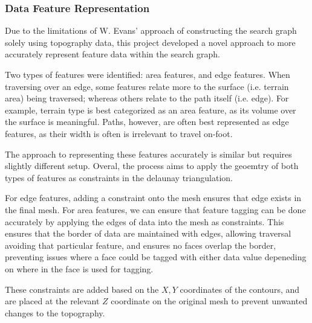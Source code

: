 \documentclass[12pt]{article}
\begin{document}
\subsubsection{Data Feature Representation}


Due to the limitations of W. Evans' approach of constructing the search graph solely using topography data, this project developed a novel approach to more accurately represent feature data within the search graph.

Two types of features were identified: area features, and edge features. When traversing over an edge, some features relate more to the surface (i.e. terrain area) being traversed; whereas others relate to the path itself (i.e. edge). For example, terrain type is best categorized as an area feature, as its volume over the surface is meaningful. Paths, however, are often best represented as edge features, as their width is often is irrelevant to travel on-foot.

The approach to representing these features accurately is similar but requires slightly different setup. Overal, the process aims to apply the geoemtry of both types of features as constraints in the delaunay triangulation.

For edge features, adding a constraint onto the mesh ensures that edge exists in the final mesh. For area features, we can ensure that feature tagging can be done accurately by applying the edges of data into the mesh as constraints. This ensures that the border of data are maintained with edges, allowing traversal avoiding that particular feature, and ensures no faces overlap the border, preventing issues where a face could be tagged with either data value depeneding on where in the face is used for tagging.

These constraints are added based on the $X,Y$ coordinates of the contours, and are placed at the relevant $Z$ coordinate on the original mesh to prevent unwanted changes to the topography.
\end{document}

